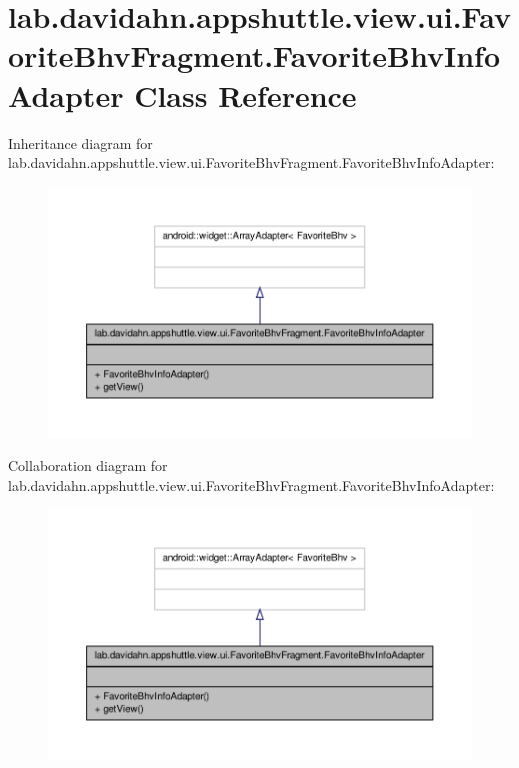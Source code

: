 \hypertarget{classlab_1_1davidahn_1_1appshuttle_1_1view_1_1ui_1_1_favorite_bhv_fragment_1_1_favorite_bhv_info_adapter}{\section{lab.\-davidahn.\-appshuttle.\-view.\-ui.\-Favorite\-Bhv\-Fragment.\-Favorite\-Bhv\-Info\-Adapter \-Class \-Reference}
\label{classlab_1_1davidahn_1_1appshuttle_1_1view_1_1ui_1_1_favorite_bhv_fragment_1_1_favorite_bhv_info_adapter}
}


\-Inheritance diagram for lab.\-davidahn.\-appshuttle.\-view.\-ui.\-Favorite\-Bhv\-Fragment.\-Favorite\-Bhv\-Info\-Adapter\-:
\nopagebreak
\begin{figure}[H]
\begin{center}
\leavevmode
\includegraphics[width=350pt]{classlab_1_1davidahn_1_1appshuttle_1_1view_1_1ui_1_1_favorite_bhv_fragment_1_1_favorite_bhv_info_adapter__inherit__graph}
\end{center}
\end{figure}


\-Collaboration diagram for lab.\-davidahn.\-appshuttle.\-view.\-ui.\-Favorite\-Bhv\-Fragment.\-Favorite\-Bhv\-Info\-Adapter\-:
\nopagebreak
\begin{figure}[H]
\begin{center}
\leavevmode
\includegraphics[width=350pt]{classlab_1_1davidahn_1_1appshuttle_1_1view_1_1ui_1_1_favorite_bhv_fragment_1_1_favorite_bhv_info_adapter__coll__graph}
\end{center}
\end{figure}
